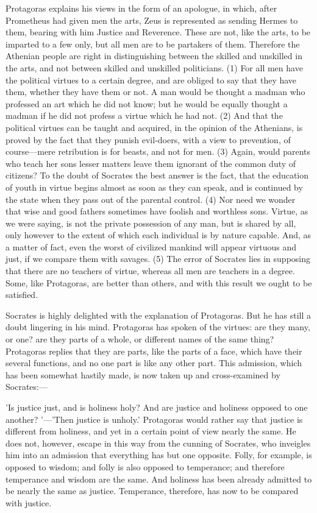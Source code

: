 \documentclass[11pt,letter]{article}
\begin{document}
\par  Protagoras explains his views in the form of an apologue, in which, after Prometheus had given men the arts, Zeus is represented as sending Hermes to them, bearing with him Justice and Reverence. These are not, like the arts, to be imparted to a few only, but all men are to be partakers of them. Therefore the Athenian people are right in distinguishing between the skilled and unskilled in the arts, and not between skilled and unskilled politicians. (1) For all men have the political virtues to a certain degree, and are obliged to say that they have them, whether they have them or not. A man would be thought a madman who professed an art which he did not know; but he would be equally thought a madman if he did not profess a virtue which he had not. (2) And that the political virtues can be taught and acquired, in the opinion of the Athenians, is proved by the fact that they punish evil-doers, with a view to prevention, of course—mere retribution is for beasts, and not for men. (3) Again, would parents who teach her sons lesser matters leave them ignorant of the common duty of citizens? To the doubt of Socrates the best answer is the fact, that the education of youth in virtue begins almost as soon as they can speak, and is continued by the state when they pass out of the parental control. (4) Nor need we wonder that wise and good fathers sometimes have foolish and worthless sons. Virtue, as we were saying, is not the private possession of any man, but is shared by all, only however to the extent of which each individual is by nature capable. And, as a matter of fact, even the worst of civilized mankind will appear virtuous and just, if we compare them with savages. (5) The error of Socrates lies in supposing that there are no teachers of virtue, whereas all men are teachers in a degree. Some, like Protagoras, are better than others, and with this result we ought to be satisfied.

\par  Socrates is highly delighted with the explanation of Protagoras. But he has still a doubt lingering in his mind. Protagoras has spoken of the virtues: are they many, or one? are they parts of a whole, or different names of the same thing? Protagoras replies that they are parts, like the parts of a face, which have their several functions, and no one part is like any other part. This admission, which has been somewhat hastily made, is now taken up and cross-examined by Socrates:—

\par  'Is justice just, and is holiness holy? And are justice and holiness opposed to one another? '—'Then justice is unholy.' Protagoras would rather say that justice is different from holiness, and yet in a certain point of view nearly the same. He does not, however, escape in this way from the cunning of Socrates, who inveigles him into an admission that everything has but one opposite. Folly, for example, is opposed to wisdom; and folly is also opposed to temperance; and therefore temperance and wisdom are the same. And holiness has been already admitted to be nearly the same as justice. Temperance, therefore, has now to be compared with justice.
\end{document}
